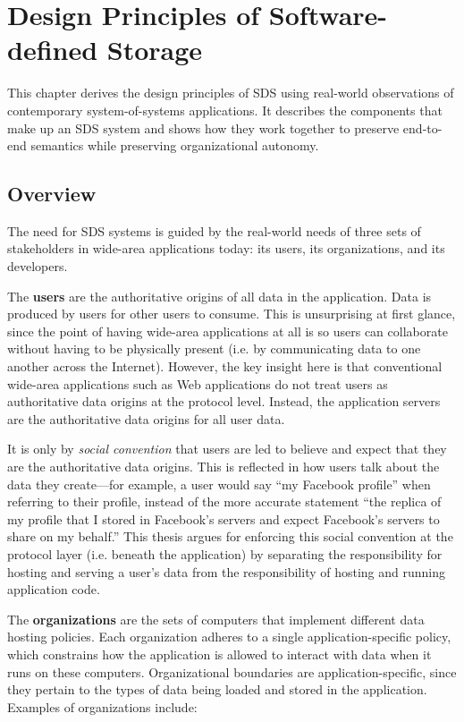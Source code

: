 \chapter{Design Principles of Software-defined Storage}
\label{chap:design_principles}

This chapter derives the design
principles of SDS using real-world observations of contemporary
system-of-systems applications.
It describes the components that make up an SDS system
and shows how they work together to preserve end-to-end semantics while
preserving organizational autonomy.

\section{Overview}

The need for SDS systems is guided by the real-world needs of three sets of stakeholders in
wide-area applications today:  its users, its organizations, and its developers.

The \textbf{users} are the authoritative origins of all data in the application.
Data is produced by users for other users to consume.  This is unsurprising at
first glance, since the point of having wide-area applications at all is so users can
collaborate without having to be physically present 
(i.e. by communicating data to one another across the Internet).  However, the
key insight here is that conventional wide-area applications such as Web
applications do not treat users as authoritative data origins at the protocol
level.  Instead, the application servers are the authoritative data origins for
all user data. 

It is only by \emph{social convention} that users are led to believe and
expect that they are the authoritative data origins.  This is reflected in how
users talk about the data they create---for example, a user would say ``my
Facebook profile'' when referring to their profile, instead of the more accurate
statement ``the replica of my profile that I stored in Facebook's servers and
expect Facebook's servers to share on my behalf.''   This thesis argues for enforcing this
social convention at the protocol layer (i.e. beneath the application)
by separating the responsibility for hosting
and serving a user's data from the responsibility of hosting and running
application code.

The \textbf{organizations} are the sets of computers that implement different
data hosting policies.  Each organization adheres to a single
application-specific policy, which constrains how the application is allowed to
interact with data when it runs on these computers.  Organizational boundaries
are application-specific, since they pertain to the types of data being loaded
and stored in the application.  Examples of organizations include:

